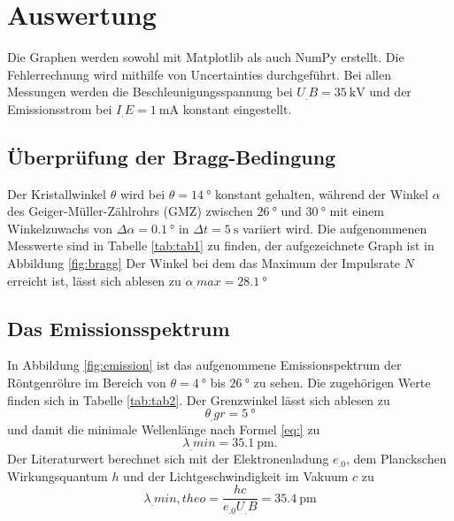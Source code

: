 \section{Auswertung}
\label{sec:Auswertung}


Die Graphen werden sowohl mit Matplotlib \cite{matplotlib} als auch NumPy \cite{numpy} erstellt. Die Fehlerrechnung wird mithilfe von Uncertainties \cite{uncertainties} durchgeführt.
Bei allen Messungen werden die Beschleunigungsspannung bei $U_.B=\SI{35}{\kilo\volt}$ und der Emissionsstrom bei $I_.E=\SI{1}{\milli\ampere}$ konstant eingestellt.

\subsection{Überprüfung der Bragg-Bedingung}
Der Kristallwinkel $\theta$ wird bei $\theta= \SI{14}{\degree}$ konstant gehalten, während der Winkel $\alpha$ des Geiger-Müller-Zählrohrs (GMZ) zwischen $\SI{26}{\degree}$ und $\SI{30}{\degree}$ mit einem Winkelzuwachs von $\Delta \alpha = \SI{0,1}{\degree}$ in $\Delta t = \SI{5}{\second}$ variiert wird.
Die aufgenommenen Messwerte sind in Tabelle \ref{tab:tab1} zu finden, der aufgezeichnete Graph ist in Abbildung \ref{fig:bragg}
Der Winkel bei dem das Maximum der Impulsrate $N$ erreicht ist, lässt sich ablesen zu $\alpha_.{max}=\SI{28,1}{\degree}$

\subsection{Das Emissionsspektrum}
In Abbildung \ref{fig:emission} ist das aufgenommene Emissionspektrum der Röntgenröhre im Bereich von $\theta=\SI{4}{\degree}$ bis $\SI{26}{\degree}$ zu sehen. Die zugehörigen Werte finden sich in Tabelle \ref{tab:tab2}.
Der Grenzwinkel lässt sich ablesen zu 
\[\theta_.{gr}=\SI{5}{\degree}\]
und damit die minimale Wellenlänge nach Formel \eqref{eq:} zu
\[
\lambda_.{min}=\SI{35,1}{\pico\metre}\text{.}
\]
Der Literaturwert berechnet sich mit der Elektronenladung $e_.0$, dem Planckschen Wirkungsquantum $h$ und der Lichtgeschwindigkeit im Vakuum $c$ zu
\[
\lambda_.{min,theo}=\frac{hc}{e_.0U_.B}=\SI{35,4}{\pico\metre}
\]